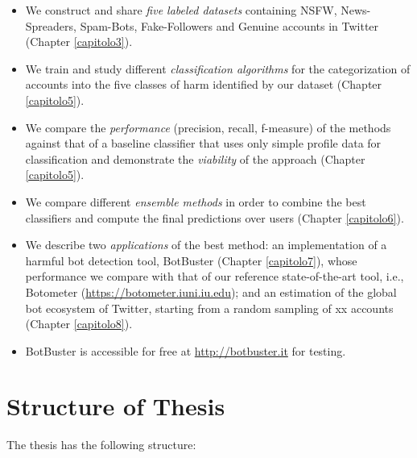 \begin{itemize}
	\item[\PencilRight] We construct and share \emph{five labeled datasets} containing NSFW, News-Spreaders, Spam-Bots, Fake-Followers and Genuine accounts in Twitter (Chapter \ref{capitolo3}).
	
	\item[\PencilRight] We train and study different \emph{classification algorithms}	for the categorization of accounts into the five classes of harm identified by our dataset (Chapter \ref{capitolo5}).
	
	\item[\PencilRight] We compare the \emph{performance} (precision, recall, f-measure) of the methods against that of a baseline classifier that uses only simple profile data for classification and demonstrate the \emph{viability} of the approach (Chapter \ref{capitolo5}).
	
	\item[\PencilRight] We compare different \emph{ensemble methods} in order to combine the best classifiers and compute  the final predictions over users (Chapter \ref{capitolo6}).
	
	\item[\PencilRight] We describe two \emph{applications} of the best method: an implementation of a harmful bot detection tool, BotBuster (Chapter \ref{capitolo7}), whose performance we compare with that of our reference state-of-the-art tool, i.e., Botometer (\url{https://botometer.iuni.iu.edu}); and an estimation of the global bot ecosystem of Twitter, starting from a random sampling of xx accounts (Chapter \ref{capitolo8}).
	
	\item[\PencilRight] BotBuster is accessible for free at \url{http://botbuster.it} for testing.
\end{itemize}


\section{Structure of Thesis}

The thesis has the following structure:

